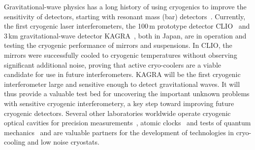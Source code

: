 Gravitational-wave physics has a long history of using cryogenics to improve the sensitivity of detectors, starting with resonant mass (bar) detectors~\cite{ColdBars}. Currently, the first cryogenic laser interferometers, the 100\,m prototype detector CLIO~\cite{CLIO:2008} and 3\,km gravitational-wave detector KAGRA~\cite{KAGRA2013}, both in Japan, are in operation and testing the cryogenic performance of mirrors and suspensions. 
In CLIO, the mirrors were successfully cooled to cryogenic temperatures without observing significant additional noise, proving that active cryo-coolers are a viable candidate for use in future interferometers. KAGRA will be the first cryogenic interferometer large and sensitive enough to detect gravitational waves. It will thus provide a valuable test bed for uncovering the important unknown problems with sensitive cryogenic interferometery, a key step toward improving future cryogenic detectors. Several other laboratories worldwide operate cryogenic optical cavities for precision measurements~\cite{Mueller:03}, atomic clocks~\cite{JunYeGroup:2019} and tests of quantum mechanics~\cite{CaltechIQIM} and are valuable partners for the development of technologies in cryo-cooling and low noise cryostats. 



